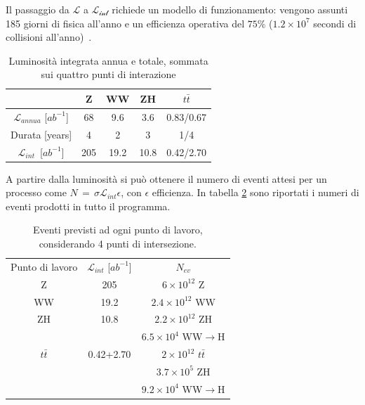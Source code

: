 Il passaggio da $\mathcal{L}$ a $\mathcal{L_{int}}$ richiede un modello di funzionamento: vengono assunti 185 giorni di fisica all'anno e un efficienza operativa del $75\%$ ($1.2\times10^7$ secondi di collisioni all'anno)~\cite{FCC:FSR-v1}.

\begin{table}
    \centering
    \begin{tabular}{c|cccc}
         & Z & WW & ZH & $t\bar t$ \\
        \hline
        $\mathcal{L}_{annua}$ [$ab^{-1}$]     & 68  & 9.6  & 3.6  & 0.83/0.67 \\
        Durata [years]                        & 4   & 2    & 3    & 1/4       \\
        $\mathcal{L}_{int}$\footnotemark\ [$ab^{-1}$] & 205 & 19.2 & 10.8 & 0.42/2.70 \\
    \end{tabular}
    \label{tab:valLumi}
    \caption{Luminosità integrata annua e totale, sommata sui quattro punti di interazione}
\end{table}


A partire dalla luminosità si può ottenere il numero di eventi attesi per un processo come $N\,=\,\sigma\mathcal{L}_{int}\epsilon$, con $\epsilon$ efficienza. In tabella \ref{tab:evProdotti} sono riportati i numeri di eventi prodotti in tutto il programma.

\begin{table}
    \centering
    \begin{tabular}{c|cc}
        Punto di lavoro & $\mathcal{L}_{int}$ [$ab^{-1}$] & $N_{ev}$                           \\
        Z               & 205                             & $6\times10^{12}$ Z                 \\
        WW              & 19.2                            & $2.4\times10^{12}$ WW              \\
        ZH              & 10.8                            & $2.2\times10^{12}$ ZH              \\
                        &                                 & $6.5\times10^{4}$ WW$\rightarrow$H \\
        $t\bar t$       & 0.42+2.70                       & $2\times10^{12}$ $t\bar t$         \\
                        &                                 & $3.7\times10^{5}$ ZH               \\
                        &                                 & $9.2\times10^{4}$ WW$\rightarrow$H \\

    \end{tabular}
    \caption{Eventi previsti ad ogni punto di lavoro, considerando 4 punti di intersezione.}
    \label{tab:evProdotti}
\end{table}

